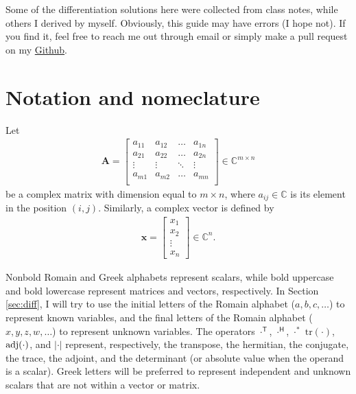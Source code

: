 \documentclass{article}
\newcommand{\trans}{\mathsf{T}}
\newcommand{\hermit}{\mathsf{H}}
\newcommand\abs[1]{\left\lvert#1\right\rvert}
\begin{document}
Some of the differentiation solutions here were collected from class notes, while others I derived by myself. Obviously, this guide may have errors (I hope not). If you find it, feel free to reach me out through email or simply make a pull request on my \href{https://github.com/tapyu/courses/tree/main/matrix_diff_ref}{Github}.

\section{Notation and nomeclature}

Let
\begin{align}
    \mathbf{A} = \begin{bmatrix}
        a_{11} & a_{12} & \dots & a_{1n} \\
        a_{21} & a_{22} & \dots & a_{2n} \\
        \vdots & \vdots & \ddots & \vdots \\
        a_{m1} & a_{m2} & \dots & a_{mn} \\
    \end{bmatrix} \in \mathbb{C}^{m \times n}
\end{align}
be a complex matrix with dimension equal to \(m \times n\), where \(a_{ij} \in \mathbb{C}\) is its element in the position \((i,j)\). Similarly, a complex vector is defined by
\begin{align}
    \mathbf{x} = \begin{bmatrix}
        x_1 \\
        x_2 \\
        \vdots \\
        x_n
    \end{bmatrix}  \in \mathbb{C}^{n}.
\end{align}

Nonbold Romain and Greek alphabets represent scalars, while bold uppercase and bold lowercase represent matrices and vectors, respectively. In Section \ref{sec:diff}, I will try to use the initial letters of the Romain alphabet (\(a, b, c, \dots\)) to represent known variables, and the final letters of the Romain alphabet (\(x, y, z, w, \dots\)) to represent unknown variables. The operators \(\cdot^{\trans}\), \(\cdot^{\hermit}\), \(\cdot^*\) \(\text{tr}(\cdot)\), \(\textnormal{adj}(\cdot)\), and \(\abs{\cdot}\) represent, respectively, the transpose, the hermitian, the conjugate, the trace, the adjoint, and the determinant (or absolute value when the operand is a scalar). Greek letters will be preferred to represent independent and unknown scalars that are not within a vector or matrix.
\end{document}
